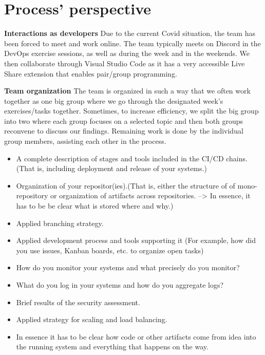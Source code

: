 \section{Process' perspective}

\textbf{Interactions as developers}\newline
  Due to the current Covid situation, the team has been forced to meet and work online. The team typically meets on Discord in the DevOps
  exercise sessions, as well as during the week and in the weekends. We then collaborate through Visual Studio Code as it has a very
  accessible Live Share extension that enables pair/group programming. 
  \newline
 
\textbf{Team organization}\newline
  The team is organized in such a way that we often work together as one big group where we go through the designated week's exercises/tasks together. 
  Sometimes, to increase efficiency, we split the big group into two where each group focuses on a selected topic
  and then both groups reconvene to discuss our findings. Remaining work is done by the individual group members, assisting each other in the process.

  
  \begin{itemize}
  \item A complete description of stages and tools included in the CI/CD chains.(That is, including deployment and release of your systems.)
  \item Organization of your repositor(ies).(That is, either the structure of of mono-repository or organization of artifacts across repositories. --> In essence, it has to be be clear what is stored where and why.)
  \item Applied branching strategy.
  \item Applied development process and tools supporting it (For example, how did you use issues, Kanban boards, etc. to organize open tasks)
  \item How do you monitor your systems and what precisely do you monitor?
  \item What do you log in your systems and how do you aggregate logs?
  \item Brief results of the security assessment.
  \item Applied strategy for scaling and load balancing.
  \item In essence it has to be clear how code or other artifacts come from idea into the running system and everything that happens on the way.
  
\end{itemize}
